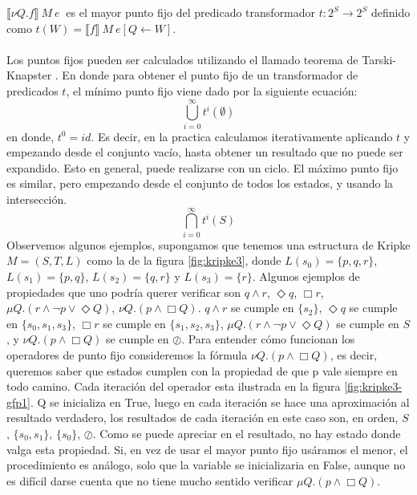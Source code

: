 \noindent $\llbracket \nu Q. f \rrbracket  \ M\ e\ $ es el mayor punto fijo del predicado transformador $t:2^{S} \to 2^{S}$ definido como $t(W) = \llbracket f \rrbracket \ M\ e[Q \gets W] $.\\
\\
Los puntos fijos pueden ser calculados utilizando el llamado teorema de Tarski-Knapster \cite{Tarski:17}. En donde para obtener el punto fijo de un transformador de predicados $t$, el mínimo punto fijo viene dado por la siguiente ecuación:
$$
	\bigcup^\infty_{i=0} t^i(\emptyset)
$$
en donde, $t^0 = id$. Es decir, en la practica calculamos iterativamente aplicando $t$ y empezando desde el conjunto vacío, hasta obtener un resultado que no puede ser expandido. Esto en general, puede realizarse con un ciclo. El máximo punto fijo es similar, pero empezando desde el conjunto de
todos los estados, y usando la intersección.
$$
	\bigcap^\infty_{i=0} t^i(S)
$$
Observemos algunos ejemplos, supongamos que tenemos una estructura de Kripke $M = (S,T,L)$ como la de la figura \ref{fig:kripke3}, donde $L(s_{0}) = \{p,q,r\}$, $L(s_{1}) = \{p,q\}$, $L(s_{2}) = \{q,r\}$ y $L(s_{3}) = \{r\}$. Algunos ejemplos de propiedades que uno podría querer verificar son $q \land r$, $\Diamond q$, $\Box r$, $\mu Q. (r \land \neg p \lor \Diamond Q)$, $\nu Q. (p \land \Box Q)$. $q \land r$ se cumple en $\{s_{2}\}$, $\Diamond q$ se cumple en $\{s_{0},s_{1},s_{3}\}$, $\Box r$ se cumple en $\{s_{1},s_{2},s_{3}\}$, $\mu Q. (r \land \neg p \lor \Diamond Q)$ se cumple en $S$, y $\nu Q. (p \land \Box Q)$ se cumple en $\oslash$. Para entender cómo funcionan los operadores de punto fijo consideremos la fórmula $\nu Q. (p \land \Box Q)$, es decir, queremos saber que estados cumplen con la propiedad de que p vale siempre en todo camino. Cada iteración del operador esta ilustrada en la figura \ref{fig:kripke3-gfp1}. Q se inicializa en True, luego en cada iteración se hace una aproximación al resultado verdadero, los resultados de cada iteración en este caso son, en orden, $S$, $\{s_{0},s_{1}\}$, $\{s_{0}\}$, $\oslash$. Como se puede apreciar en el resultado, no hay estado donde valga esta propiedad. Si, en vez de usar el mayor punto fijo usáramos el menor, el procedimiento es análogo, solo que la variable se inicializaria en False, aunque no es difícil darse cuenta que no tiene mucho sentido verificar $\mu Q.(p \land \Box Q)$.


